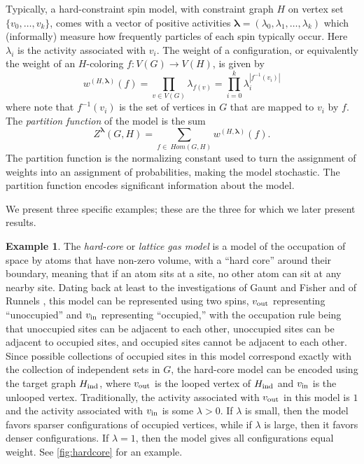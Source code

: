 \documentclass[11pt]{article}
\theoremstyle{definition}
\newtheorem{example}[theorem]{Example}
\begin{document}
Typically, a hard-constraint spin model, with constraint graph $H$ on vertex set $\{v_0, \ldots, v_k\}$, comes with a vector of positive activities ${\boldsymbol\lambda}=(\lambda_0, \lambda_1, \ldots, \lambda_k)$ which (informally) measure how frequently particles of each spin typically occur. Here $\lambda_i$ is the activity associated with $v_i$. The weight of a configuration, or equivalently the weight of an $H$-coloring $f:V(G)\rightarrow V(H)$, is given by 
\begin{equation} \label{eq:config-weight}
w^{(H,{\boldsymbol\lambda})}(f) = \prod_{v \in V(G)} \lambda_{f(v)} = \prod_{i=0}^k \lambda_i^{|f^{-1}(v_i)|}
\end{equation}
where note that $f^{-1}(v_i)$ is the set of vertices in $G$ that are mapped to $v_i$ by $f$. The {\it partition function} of the model is the sum 
\[
Z^{\boldsymbol\lambda}(G,H) = \sum_{f \in \
Hom(G,H)} w^{(H,{\boldsymbol\lambda})}(f).
\]
The partition function is the normalizing constant used to turn the assignment of weights into an assignment of probabilities, making the model stochastic. The partition function encodes significant information about the model.

We present three specific examples; these are the three for which we later present results.
\begin{example} \label{ex:hc-model}
The {\it hard-core} or {\it lattice gas model} is a model of the occupation of space by atoms that have non-zero volume, with a ``hard core'' around their boundary, meaning that if an atom sits at a site, no other atom can sit at any nearby site. Dating back at least to the investigations of Gaunt and Fisher and of Runnels \cite{GauntFisher1965, Runnels1965}, this model can be represented using two spins, $v_{\rm out}$ representing ``unoccupied'' and $v_{\rm in}$ representing ``occupied,'' with the occupation rule being that unoccupied sites can be adjacent to each other, unoccupied sites can be adjacent to occupied sites, and occupied sites cannot be adjacent to each other. Since possible collections of occupied sites in this model correspond exactly with the collection of independent sets in $G$, the hard-core model can be encoded using the target graph $H_{\rm ind}$, where $v_{\rm out}$ is the looped vertex of $H_{\rm ind}$ and $v_{\rm in}$ is the unlooped vertex. Traditionally, the activity associated with $v_{\rm out}$ in this model is $1$ and the activity associated with $v_{\rm in}$ is some $\lambda > 0$. If $\lambda$ is small, then the model favors sparser configurations of occupied vertices, while if $\lambda$ is large, then it favors denser configurations. If $\lambda=1$, then the model gives all configurations equal weight. See \cref{fig:hardcore} for an example.
\end{example}
\end{document}
